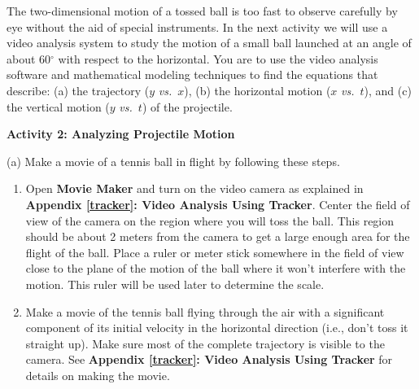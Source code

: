 The two-dimensional motion of a tossed ball is too fast to observe carefully
by eye without the aid of special instruments. In the next activity we will
use a video analysis system to study the motion of a small ball launched at
an angle of about 60\( ^{\circ } \) with respect to the horizontal. You are
to use the video analysis software and mathematical modeling techniques to find
the equations that describe: (a) the trajectory ($y$ \textit{vs.}~$x$), 
(b) the horizontal
motion ($x$ \textit{vs.}~$t$), and (c) the vertical motion ($y$ \textit{vs.}~$t$) of the projectile.

\newpage
\textbf{Activity 2: Analyzing Projectile Motion} 

(a) Make a movie of a tennis ball in flight by following these steps. 

\begin{enumerate}
\item Open \textbf{Movie Maker} and turn on the video camera as explained in \textbf{Appendix \ref{tracker}: Video Analysis Using Tracker}. Center the field of view of the camera on the region where you will toss the ball. This region should be about 2 meters from the camera to
get a large enough area for the flight of the ball. Place a ruler or meter stick
somewhere in the field of view close to the plane of the motion of the ball
where it won't interfere with the motion. This ruler will be used later to determine the scale. 
\item Make a movie of the tennis ball flying through the air with a significant component
of its initial velocity in the horizontal direction (i.e., don't toss it straight
up). Make sure most of the complete trajectory is visible to the camera. See
\textbf{Appendix \ref{tracker}: Video Analysis Using Tracker} for details on making the movie. 

\end{enumerate}
